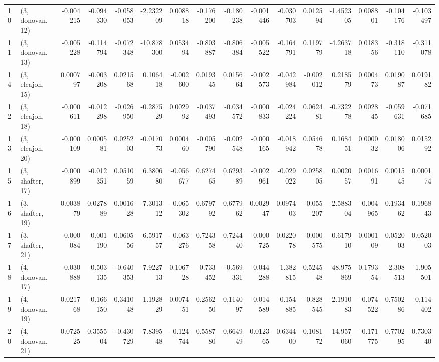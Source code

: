 \begin{tabular}{llrrrrrrrrrrrrrr}
10 &  (3, donovan, 12) &  -0.004215 & -0.094330 & -0.058053 &  -2.232209 &  0.008818 &  -0.176200 & -0.180238 & -0.001446 & -0.030703 &  0.012594 &  -1.452305 &  0.008801 & -0.104176 & -0.103497 \\
11 &  (3, donovan, 13) &  -0.005228 & -0.114794 & -0.072348 & -10.878300 &  0.053494 &  -0.803887 & -0.806384 & -0.005522 & -0.164791 &  0.119779 &  -4.263718 &  0.018356 & -0.318110 & -0.311078 \\
14 &  (3, elcajon, 15) &   0.000797 & -0.003208 &  0.021568 &   0.106418 & -0.002600 &   0.019345 &  0.015664 & -0.002573 & -0.042984 & -0.002012 &   0.218579 &  0.000473 &  0.019087 &  0.019182 \\
12 &  (3, elcajon, 18) &  -0.000611 & -0.012298 & -0.026950 &  -0.287529 &  0.002992 &  -0.037493 & -0.034572 & -0.000833 & -0.024224 &  0.062481 &  -0.732278 &  0.002845 & -0.059631 & -0.071685 \\
13 &  (3, elcajon, 20) &  -0.000109 &  0.000581 &  0.025203 &  -0.017073 &  0.000460 &  -0.005790 & -0.002548 & -0.000165 & -0.018942 &  0.054678 &   0.168451 &  0.000032 &  0.018006 &  0.015292 \\
15 &  (3, shafter, 17) &  -0.000899 & -0.012351 &  0.051059 &   6.380680 & -0.056677 &   0.627465 &  0.629389 & -0.002961 & -0.029022 &  0.025805 &   0.002057 &  0.001691 &  0.001545 &  0.000174 \\
16 &  (3, shafter, 19) &   0.003879 &  0.027889 &  0.001628 &   7.301312 & -0.065302 &   0.679792 &  0.677962 &  0.002947 &  0.097403 & -0.055207 &   2.588304 & -0.004965 &  0.193462 &  0.196843 \\
17 &  (3, shafter, 21) &  -0.000084 & -0.001190 &  0.060556 &   6.591757 & -0.063276 &   0.724358 &  0.724440 & -0.000725 &  0.022078 & -0.000575 &   0.617910 &  0.000109 &  0.052003 &  0.052003 \\
18 &  (4, donovan, 17) &  -0.030888 & -0.503135 & -0.640353 &  -7.922713 &  0.106728 &  -0.733452 & -0.569331 & -0.044288 & -1.382815 &  0.524548 & -48.975869 &  0.179354 & -2.308513 & -1.905501 \\
19 &  (4, donovan, 19) &   0.021768 & -0.166150 &  0.341048 &   1.192829 &  0.007451 &   0.256250 &  0.114097 & -0.014589 & -0.154885 & -0.828545 &  -2.191083 & -0.074522 &  0.750286 & -0.114402 \\
20 &  (4, donovan, 21) &   0.072525 &  0.355504 & -0.430729 &   7.839548 & -0.124744 &   0.558780 &  0.664949 &  0.012365 &  0.634400 &  0.108172 &  14.957060 & -0.171775 &  0.770295 &  0.730340 \\

\end{tabular}
